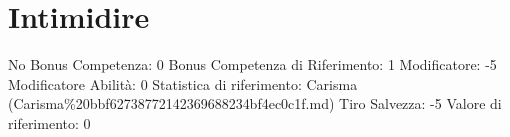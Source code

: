 \section{Intimidire}\label{intimidire}

\begin{description}
\tightlist
\item[Tags: ABI]
No Bonus Competenza: 0 Bonus Competenza di Riferimento: 1 Modificatore:
-5 Modificatore Abilità: 0 Statistica di riferimento: Carisma
(Carisma\%20bbf62738772142369688234bf4ec0c1f.md) Tiro Salvezza: -5
Valore di riferimento: 0
\end{description}
